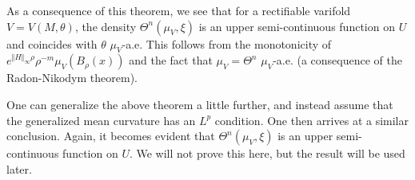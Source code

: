 As a consequence of this theorem, we see that for a rectifiable varifold $V=V(M,\theta)$, the density $\Theta^n(\mu_V,\xi)$ is an upper semi-continuous function on $U$ and coincides with $\theta$ $\mu_V$-a.e. This follows from the monotonicity of $e^{\Vert H \Vert_{\infty}\rho} \rho^{-m}\mu_V(B_{\rho}(x))$ and the fact that $\mu_V=\Theta^n$ $\mu_V$-a.e. (a consequence of the Radon-Nikodym theorem).

One can generalize the above theorem a little further, and instead assume that the generalized mean curvature has an $L^{p}$ condition. One then arrives at a similar conclusion. Again, it becomes evident that $\Theta^n(\mu_V,\xi)$ is an upper semi-continuous function on $U$. We will not prove this here, but the result will be used later.